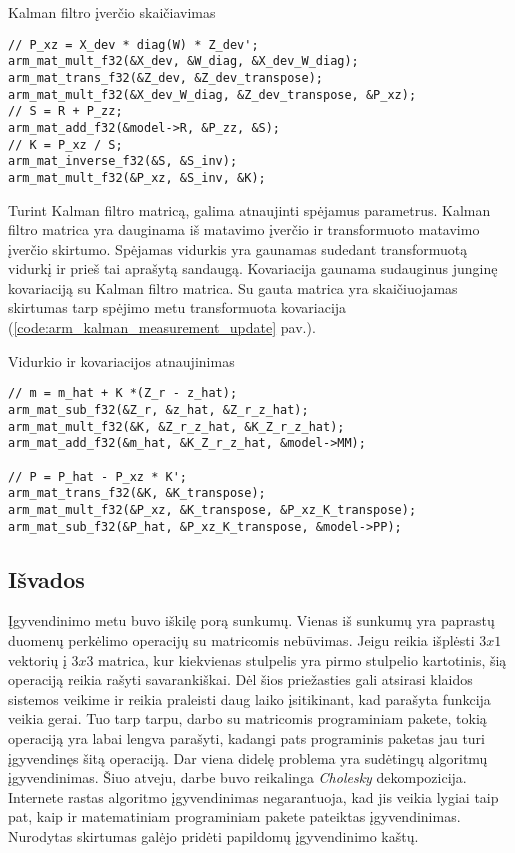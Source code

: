 \begin{cfigure}
    \centering
    \caption{Kalman filtro įverčio skaičiavimas}
    \label{code:arm_kalman_gain_calculation}
    \begin{lstlisting}
// P_xz = X_dev * diag(W) * Z_dev';
arm_mat_mult_f32(&X_dev, &W_diag, &X_dev_W_diag);
arm_mat_trans_f32(&Z_dev, &Z_dev_transpose);
arm_mat_mult_f32(&X_dev_W_diag, &Z_dev_transpose, &P_xz);
// S = R + P_zz;
arm_mat_add_f32(&model->R, &P_zz, &S);
// K = P_xz / S;
arm_mat_inverse_f32(&S, &S_inv);
arm_mat_mult_f32(&P_xz, &S_inv, &K);
    \end{lstlisting}
\end{cfigure}

Turint Kalman filtro matricą, galima atnaujinti spėjamus parametrus.
Kalman filtro matrica yra dauginama iš matavimo įverčio ir transformuoto matavimo įverčio skirtumo.
Spėjamas vidurkis yra gaunamas sudedant transformuotą vidurkį ir prieš tai aprašytą sandaugą.
Kovariacija gaunama sudauginus junginę kovariaciją su Kalman filtro matrica.
Su gauta matrica yra skaičiuojamas skirtumas tarp spėjimo metu transformuota kovariacija (\ref{code:arm_kalman_measurement_update} pav.).

\begin{cfigure}
    \centering
    \caption{Vidurkio ir kovariacijos atnaujinimas}
    \label{code:arm_kalman_measurement_update}
    \begin{lstlisting}
// m = m_hat + K *(Z_r - z_hat);
arm_mat_sub_f32(&Z_r, &z_hat, &Z_r_z_hat);
arm_mat_mult_f32(&K, &Z_r_z_hat, &K_Z_r_z_hat);
arm_mat_add_f32(&m_hat, &K_Z_r_z_hat, &model->MM);

// P = P_hat - P_xz * K';
arm_mat_trans_f32(&K, &K_transpose);
arm_mat_mult_f32(&P_xz, &K_transpose, &P_xz_K_transpose);
arm_mat_sub_f32(&P_hat, &P_xz_K_transpose, &model->PP);
    \end{lstlisting}
\end{cfigure}

\subsection{Išvados}

Įgyvendinimo metu buvo iškilę porą sunkumų.
Vienas iš sunkumų yra paprastų duomenų perkėlimo operacijų su matricomis nebūvimas.
Jeigu reikia išplėsti $3x1$ vektorių į $3x3$ matrica, kur kiekvienas stulpelis yra pirmo stulpelio kartotinis, šią operaciją reikia rašyti savarankiškai.
Dėl šios priežasties gali atsirasi klaidos sistemos veikime ir reikia praleisti daug laiko įsitikinant, kad parašyta funkcija veikia gerai.
Tuo tarp tarpu, darbo su matricomis programiniam pakete, tokią operaciją yra labai lengva parašyti, kadangi pats programinis paketas jau turi įgyvendinęs šitą operaciją.
Dar viena didelę problema yra sudėtingų algoritmų įgyvendinimas.
Šiuo atveju, darbe buvo reikalinga \textit{Cholesky} dekompozicija.
Internete rastas algoritmo įgyvendinimas negarantuoja, kad jis veikia lygiai taip pat, kaip ir matematiniam programiniam pakete pateiktas įgyvendinimas.
Nurodytas skirtumas galėjo pridėti papildomų įgyvendinimo kaštų.


